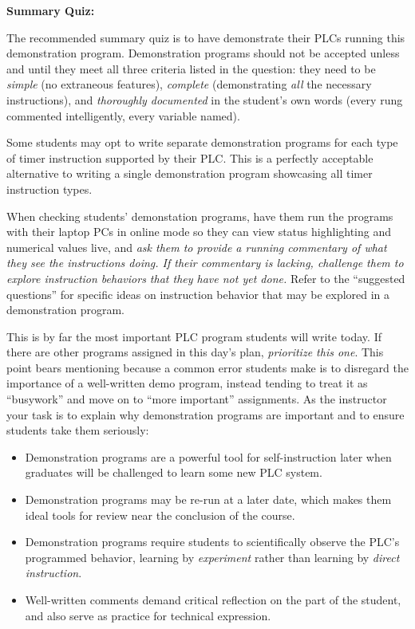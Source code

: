 \noindent
{\bf Summary Quiz:}

The recommended summary quiz is to have  demonstrate their PLCs running this demonstration program.  Demonstration programs should not be accepted unless and until they meet all three criteria listed in the question: they need to be {\it simple} (no extraneous features), {\it complete} (demonstrating {\it all} the necessary instructions), and {\it thoroughly documented} in the student's own words (every rung commented intelligently, every variable named).

\vskip 10pt

Some students may opt to write separate demonstration programs for each type of timer instruction supported by their PLC.  This is a perfectly acceptable alternative to writing a single demonstration program showcasing all timer instruction types.

\vskip 10pt

When checking students' demonstation programs, have them run the programs with their laptop PCs in online mode so they can view status highlighting and numerical values live, and {\it ask them to provide a running commentary of what they see the instructions doing.  If their commentary is lacking, challenge them to explore instruction behaviors that they have not yet done.}  Refer to the ``suggested questions'' for specific ideas on instruction behavior that may be explored in a demonstration program.

\vskip 10pt

This is by far the most important PLC program students will write today.  If there are other programs assigned in this day's plan, {\it prioritize this one}.  This point bears mentioning because a common error students make is to disregard the importance of a well-written demo program, instead tending to treat it as ``busywork'' and move on to ``more important'' assignments.  As the instructor your task is to explain why demonstration programs are important and to ensure students take them seriously:

\begin{itemize}
\item{} Demonstration programs are a powerful tool for self-instruction later when graduates will be challenged to learn some new PLC system.
\vskip 5pt
\item{} Demonstration programs may be re-run at a later date, which makes them ideal tools for review near the conclusion of the course.
\vskip 5pt
\item{} Demonstration programs require students to scientifically observe the PLC's programmed behavior, learning by {\it experiment} rather than learning by {\it direct instruction}.
\vskip 5pt
\item{} Well-written comments demand critical reflection on the part of the student, and also serve as practice for technical expression.
\end{itemize}









